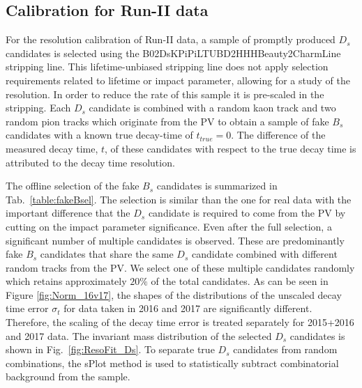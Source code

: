 \subsection{Calibration for Run-II data }
\label{ssec:ResRun2}

For the resolution calibration of Run-II data, a sample of promptly produced $D_s$ candidates is selected
using the \textsf{B02DsKPiPiLTUBD2HHHBeauty2CharmLine} stripping line.
This lifetime-unbiased stripping line does not apply selection requirements related to lifetime or impact parameter, allowing for a study of the resolution. 
In order to reduce the rate of this sample it is pre-scaled in the stripping.
Each $D_s$ candidate is combined with a random kaon track and two random pion tracks which originate from the PV to obtain a sample of fake $B_s$ candidates with a known true decay-time of $t_{true} = 0$. 
The difference of the measured decay time, $t$, of these candidates with respect to the true decay time is attributed to the decay time resolution. 


The offline selection of the fake $B_s$ candidates is summarized in Tab.~\ref{table:fakeBsel}.
The selection is similar than the one for real data with the important difference that the $D_s$ candidate is required to come from the PV by cutting on the impact parameter significance.
Even after the full selection, a significant number of multiple candidates is observed.
These are predominantly fake $B_s$ candidates that share the same $D_s$ candidate combined with different random tracks from the PV.
We select one of these multiple candidates randomly which retains approximately $20\%$ of the total candidates.
As can be seen in Figure \ref{fig:Norm_16v17}, the shapes of the distributions of the unscaled decay time error $\sigma_{t}$ for data taken in 2016 and 2017 are significantly different. 
Therefore, the scaling of the decay time error is treated separately for 2015+2016 and 2017 data.
The invariant mass distribution of the selected $D_s$ candidates is shown in Fig.~\ref{fig:ResoFit_Ds}.
To separate true $D_s$ candidates from random combinations, the \textsf{sPlot} method is used to statistically subtract combinatorial background from the sample.

